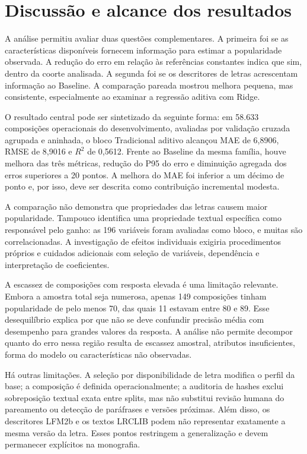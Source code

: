 \section{Discussão e alcance dos resultados}

A análise permitiu avaliar duas questões complementares. A primeira foi se as características disponíveis fornecem informação para estimar a popularidade observada. A redução do erro em relação às referências constantes indica que sim, dentro da coorte analisada. A segunda foi se os descritores de letras acrescentam informação ao Baseline. A comparação pareada mostrou melhora pequena, mas consistente, especialmente ao examinar a regressão aditiva com Ridge.

O resultado central pode ser sintetizado da seguinte forma: em 58.633 composições operacionais do desenvolvimento, avaliadas por validação cruzada agrupada e aninhada, o bloco Tradicional aditivo alcançou MAE de 6,8906, RMSE de 8,9016 e $R^2$ de 0,5612. Frente ao Baseline da mesma família, houve melhora das três métricas, redução do P95 do erro e diminuição agregada dos erros superiores a 20 pontos. A melhora do MAE foi inferior a um décimo de ponto e, por isso, deve ser descrita como contribuição incremental modesta.

A comparação não demonstra que propriedades das letras causem maior popularidade. Tampouco identifica uma propriedade textual específica como responsável pelo ganho: as 196 variáveis foram avaliadas como bloco, e muitas são correlacionadas. A investigação de efeitos individuais exigiria procedimentos próprios e cuidados adicionais com seleção de variáveis, dependência e interpretação de coeficientes.

A escassez de composições com resposta elevada é uma limitação relevante. Embora a amostra total seja numerosa, apenas 149 composições tinham popularidade de pelo menos 70, das quais 11 estavam entre 80 e 89. Esse desequilíbrio explica por que não se deve confundir precisão média com desempenho para grandes valores da resposta. A análise não permite decompor quanto do erro nessa região resulta de escassez amostral, atributos insuficientes, forma do modelo ou características não observadas.

Há outras limitações. A seleção por disponibilidade de letra modifica o perfil da base; a composição é definida operacionalmente; a auditoria de hashes exclui sobreposição textual exata entre splits, mas não substitui revisão humana do pareamento ou detecção de paráfrases e versões próximas. Além disso, os descritores LFM2b e os textos LRCLIB podem não representar exatamente a mesma versão da letra. Esses pontos restringem a generalização e devem permanecer explícitos na monografia.

